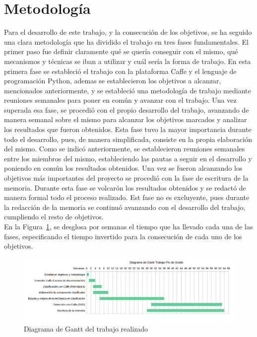 \section{Metodología}

Para el desarrollo de este trabajo, y la consecución de los objetivos, se ha seguido una clara metodología que ha dividido el trabajo en tres fases fundamentales. El primer paso fue definir claramente qué se quería conseguir con el mismo, qué mecanismos y técnicas se iban a utilizar y cuál sería la forma de trabajo. En esta primera fase se estableció el trabajo con la plataforma Caffe y el lenguaje de programación Python, ademas se establecieron los objetivos a alcanzar, mencionados anteriormente, y se estableció una metodología de trabajo mediante reuniones semanales para poner en común y avanzar con el trabajo. Una vez superada esa fase, se procedió con el propio desarrollo del trabajo, avanzando de manera semanal sobre el mismo para alcanzar los objetivos marcados y analizar los resultados que fueron obtenidos. Esta fase tuvo la mayor importancia durante todo el desarrollo, pues, de manera simplificada, consiste en la propia elaboración del mismo. Como se indicó anteriormente, se establecieron reuniones semanales entre los miembros del mismo, estableciendo las pautas a seguir en el desarrollo y poniendo en común los resultados obtenidos. Una vez se fueron alcanzando los objetivos más importantes del proyecto se procedió con la fase de escritura de la memoria. Durante esta fase se volcarón los resultados obtenidos y se redactó de manera formal todo el proceso realizado. Est fase no es excluyente, pues durante la redacción de la memoria se continuó avanzando con el desarrollo del trabajo, cumpliendo el resto de objetivos.\\

En la Figura~\ref{fig.diagrama}, se desglosa por semanas el tiempo que ha llevado cada una de las fases, especificando el tiempo invertido para la consecución de cada uno de los objetivos.

\begin{figure}[H]
	\begin{center}
		\includegraphics[width=1\textwidth]{figures/diagrama}
		\caption{Diagrama de Gantt del trabajo realizado}
		\label{fig.diagrama}
	\end{center}
\end{figure}

